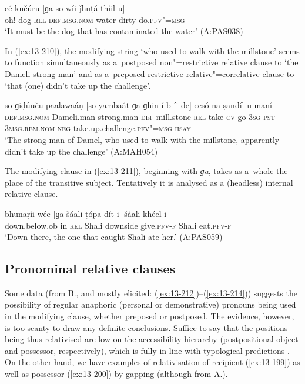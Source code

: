 \begin{exe}
\ex
\label{ex:13-209}
\gll eé kučúru [ɡa so wíi ǰhuṭá thíil-u]  \\
oh! dog \textsc{rel} \textsc{def.msg.nom} water dirty do.\textsc{pfv"=msg} \\
\glt `It must be the dog that has contaminated the water' (A:PAS038) 
\end{exe}

In (\ref{ex:13-210}), the modifying string `who used to walk with the millstone' seems to function simultaneously as a~postposed non"=restrictive relative clause to `the Dameli strong man' and as a~preposed restrictive relative"=correlative clause to `that (one) didn't take up the challenge'.

\begin{exe}
\ex
\label{ex:13-210}
\gll so ɡiḍúuču paalawaáṇ [so yambaáṭ  ɡa ɡhin-í b-íi de] eesó na  ṣandíl-u maní \\
\textsc{def.msg.nom} Dameli.man strong.man \textsc{def} mill.stone \textsc{rel} take-\textsc{cv} go-\textsc{3sg} \textsc{pst} \textsc{3msg.rem.nom} \textsc{neg} take.up.challenge.\textsc{pfv"=msg} \textsc{hsay} \\
\glt `The strong man of Damel, who used to walk with the millstone, apparently didn't take up the
challenge' (A:MAH054)
\end{exe}

The modifying clause in (\ref{ex:13-211}), beginning with \textit{ɡa}, takes as a~whole the place of the transitive subject. Tentatively it is analysed as a (headless) internal relative clause.

\begin{exe}
\ex
\label{ex:13-211}
\gll bhunaṛíi wée [ɡa šáali ṭópa dít-i]  šáali khéel-i \\
down.below.ob in \textsc{rel} Shali downside give.\textsc{pfv-f} Shali eat.\textsc{pfv-f} \\
\glt `Down there, the one that caught Shali ate her.' (A:PAS059)
\end{exe}

\subsection{Pronominal relative clauses}
\label{subsec:13-6-5}


Some data (from B., and mostly elicited: (\ref{ex:13-212})--(\ref{ex:13-214})) suggests the possibility of regular anaphoric (personal or demonstrative) pronouns being used in the modifying clause, whether preposed or postposed. The evidence, however, is too scanty to draw any definite conclusions. Suffice to say that the positions being thus relativised are low on the accessibility hierarchy (postpositional object and possessor, respectively), which is fully in line with typological predictions \citep[147--148]{keenan1985}. On the other hand, we have examples of relativisation of recipient (\ref{ex:13-199}) as well as possessor (\ref{ex:13-200}) by gapping (although from A.).

